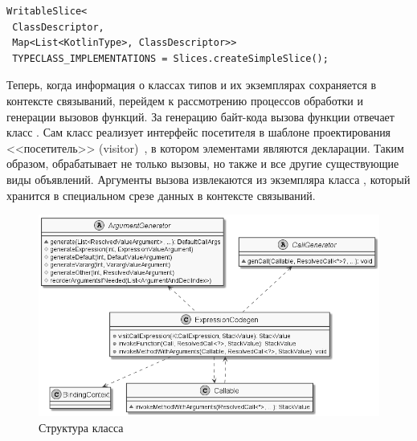 \begin{lstlisting}[style={wo_caption}]
WritableSlice<
 ClassDescriptor, 
 Map<List<KotlinType>, ClassDescriptor>> 
 TYPECLASS_IMPLEMENTATIONS = Slices.createSimpleSlice();
\end{lstlisting}

Теперь, когда информация о классах типов и их экземплярах сохраняется в контексте связываний, перейдем к рассмотрению процессов обработки и генерации вызовов функций. За генерацию байт-кода вызова функции отвечает класс . Сам класс реализует интерфейс посетителя в шаблоне проектирования <<посетитель>> (visitor)~\cite[стр.~387--419]{Martin03}, в котором элементами являются декларации. Таким образом,  обрабатывает не только вызовы, но также и все другие существующие виды объявлений. Аргументы вызова извлекаются из экземпляра класса , который хранится в специальном  срезе данных в контексте связываний.     

\begin{figure}[htbp]
    \centering
    \includegraphics[width=\textwidth]{resources/06/11_expression_codegen.png}
    \caption{Структура класса }
    \label{fig:expression-codegen}
\end{figure}

